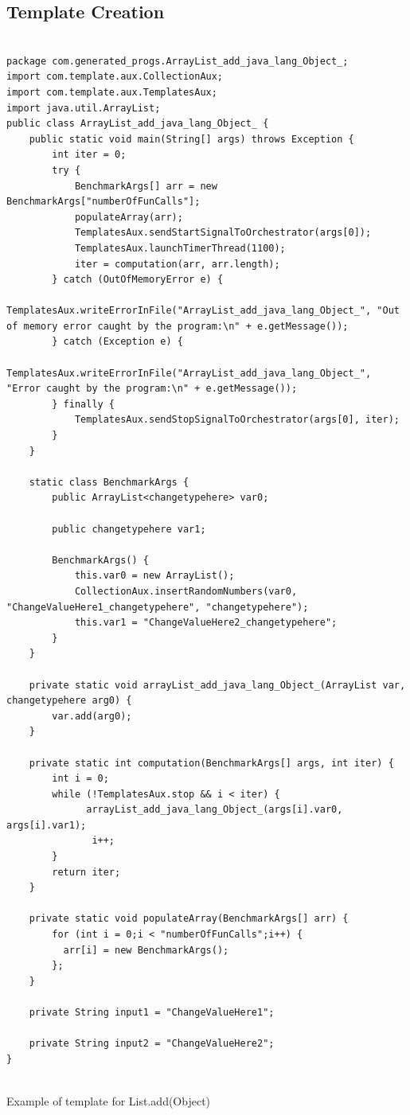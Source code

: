 \subsection{Template Creation} \label{sec:work_stage1_template_creation}


\FloatBarrier


\begin{listing}[H]
\begin{verbatim}

package com.generated_progs.ArrayList_add_java_lang_Object_;
import com.template.aux.CollectionAux;
import com.template.aux.TemplatesAux;
import java.util.ArrayList;
public class ArrayList_add_java_lang_Object_ {
    public static void main(String[] args) throws Exception {
        int iter = 0;
        try {
            BenchmarkArgs[] arr = new BenchmarkArgs["numberOfFunCalls"];
            populateArray(arr);
            TemplatesAux.sendStartSignalToOrchestrator(args[0]);
            TemplatesAux.launchTimerThread(1100);
            iter = computation(arr, arr.length);
        } catch (OutOfMemoryError e) {
            TemplatesAux.writeErrorInFile("ArrayList_add_java_lang_Object_", "Out of memory error caught by the program:\n" + e.getMessage());
        } catch (Exception e) {
            TemplatesAux.writeErrorInFile("ArrayList_add_java_lang_Object_", "Error caught by the program:\n" + e.getMessage());
        } finally {
            TemplatesAux.sendStopSignalToOrchestrator(args[0], iter);
        }
    }

    static class BenchmarkArgs {
        public ArrayList<changetypehere> var0;

        public changetypehere var1;

        BenchmarkArgs() {
            this.var0 = new ArrayList();
            CollectionAux.insertRandomNumbers(var0, "ChangeValueHere1_changetypehere", "changetypehere");
            this.var1 = "ChangeValueHere2_changetypehere";
        }
    }

    private static void arrayList_add_java_lang_Object_(ArrayList var, changetypehere arg0) {
        var.add(arg0);
    }

    private static int computation(BenchmarkArgs[] args, int iter) {
        int i = 0;
        while (!TemplatesAux.stop && i < iter) {
              arrayList_add_java_lang_Object_(args[i].var0, args[i].var1);
               i++;
        }
        return iter;
    }

    private static void populateArray(BenchmarkArgs[] arr) {
        for (int i = 0;i < "numberOfFunCalls";i++) {
          arr[i] = new BenchmarkArgs();
        };
    }

    private String input1 = "ChangeValueHere1";

    private String input2 = "ChangeValueHere2";
}


\end{verbatim}
\caption{Example of template for List.add(Object)}            
\label{lst:template_example}
\end{listing}

